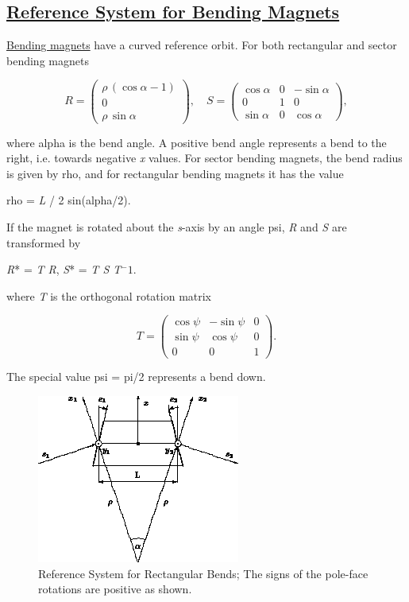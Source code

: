 \subsection{\href{rbend}{Reference System for Bending Magnets}}
\href{bend.html}{Bending magnets} have a curved reference orbit. For
both rectangular and sector bending magnets  


\[
R =
 \begin{pmatrix}
  \rho\,(\cos \alpha - 1) \\
  0 \\
  \rho\,\sin \alpha
 \end{pmatrix}
, \quad
S =
 \begin{pmatrix}
  \cos \alpha & 0 &  -\sin \alpha \\
  0 & 1 &  0 \\
  \sin \alpha & 0 &  \cos \alpha
 \end{pmatrix}
,
\]

where alpha is the bend angle. A positive bend angle represents a bend
to the right, i.e. towards negative \textit{x} values. For sector
bending magnets, the bend radius is given by rho, and for rectangular
bending magnets it has the value  

 rho = \textit{L} / 2 sin(alpha/2). 

If the magnet is rotated about the \textit{s}-axis by an angle psi,
\textit{R} and \textit{S} are transformed by  

\textit{R}* = \textit{T R}, \textit{S}* = \textit{T S T$^-1$}. 

where \textit{T} is the orthogonal rotation matrix 


\[
T =
 \begin{pmatrix}
  \cos \psi &  -\sin \psi & 0 \\
  \sin \psi &  \cos \psi  & 0 \\
  0	    &	0	  & 1 
 \end{pmatrix}
.
\]

The special value psi = pi/2 represents a bend down.  

\begin{figure}[H]
  \centering
	\includegraphics{figures/ref_rbend.png}
  \caption{Reference System for Rectangular Bends; The signs of the pole-face rotations are positive as shown.}
\end{figure}

